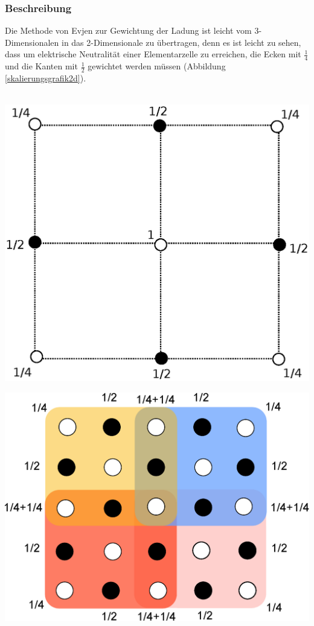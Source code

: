 \documentclass[10pt,a4paper]{article}
\begin{document}
\subsubsection{Beschreibung}
Die Methode von Evjen zur Gewichtung der Ladung ist leicht vom 3-Dimensionalen
in das 2-Dimensionale zu übertragen, denn es ist leicht zu sehen, dass um elektrische
Neutralität einer Elementarzelle zu erreichen, die Ecken mit $\frac{1}{4}$ und die Kanten mit
$\frac{1}{2}$ gewichtet werden müssen (Abbildung \ref{skalierungsgrafik2d}).
\\
\\
\begin{minipage}[c]{0.5\textwidth}
\begin{center}
\includegraphics[height=0.6\textwidth]{./figures/quadrat.eps}
\label{skalierungsgrafik2d}
\end{center}
\end{minipage}
\begin{minipage}[c]{0.5\textwidth}
\begin{center}
\includegraphics[height=0.6\textwidth]{./figures/elementarzelle.eps}
\label{zellensumme}
\end{center}
\end{minipage}
	
\end{document}
